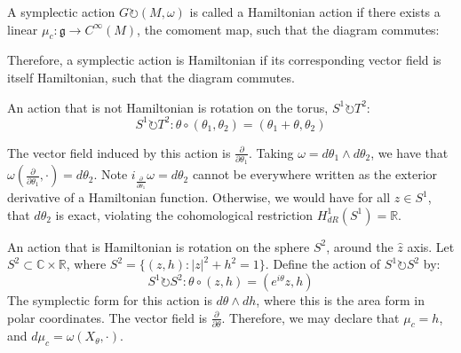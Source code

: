 \begin{defn}
 A symplectic action $G \circlearrowright (M, \omega)$ is called a Hamiltonian action if there exists a linear $\mu_{c}: \mathfrak{g} \to C^{\infty}(M)$, the comoment map, such that the diagram commutes:
\begin{center}
\end{center}
\end{defn}
\noindent Therefore, a symplectic action is Hamiltonian if its corresponding vector field is itself Hamiltonian, such that the diagram commutes. 
\begin{example}
An action that is not Hamiltonian is rotation on the torus, $S^{1} \circlearrowright T^{2}$:
\begin{equation}
S^{1} \circlearrowright T^{2}: \theta \circ (\theta_{1}, \theta_{2}) = (\theta_{1} + \theta, \theta_{2})
\end{equation}
\end{example}
The vector field induced by this action is $\frac{\partial}{\partial \theta_{1}}$. Taking $\omega = d\theta_{1} \wedge d\theta_{2}$, we have that $\omega(\frac{\partial}{\partial \theta_{1}}, \cdot) = d\theta_{2}$. Note $i_{\frac{\partial}{\partial \theta_{1}}} \omega = d\theta_{2}$ cannot be everywhere written as the exterior derivative of a Hamiltonian function. Otherwise, we would have for all $z \in S^{1}$, that $d\theta_{2}$ is exact, violating the cohomological restriction $H^{1}_{dR}(S^{1}) = \mathbb{R}$. 
\begin{example}[Rotation on $S^{2}$]
An action that is Hamiltonian is rotation on the sphere $S^2$, around the $\hat{z}$ axis.
Let $S^{2} \subset \mathbb{C} \times \mathbb{R}$, where $S^{2} = \{(z, h): |z|^2 + h^2 = 1 \}$. Define the action of $S^{1} \circlearrowright S^{2}$ by: 
\begin{equation}
S^{1} \circlearrowright S^{2}: \theta \circ (z, h) = (e^{i \theta} z, h) 
\end{equation}
The symplectic form for this action is $d\theta \wedge dh$, where this is the area form in polar coordinates. The vector field is $\frac{\partial}{\partial \theta}$. Therefore, we may declare that $\mu_{c} = h$, and $d\mu_{c} = \omega(X_{\theta}, \cdot)$.
\end{example}


